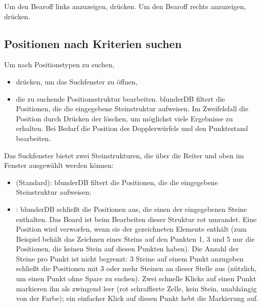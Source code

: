 \documentclass[letterpaper,10pt,german]{sphinxmanual}
\begin{document}
\sphinxAtStartPar
Um den Bearoff links anzuzeigen,  drücken. Um den Bearoff rechts anzuzeigen,  drücken.


\subsection{Positionen nach Kriterien suchen}
\label{\detokenize{guide_utilisateur:rechercher-des-positions-selon-des-criteres}}
\sphinxAtStartPar
Um nach Positionstypen zu suchen,
\begin{itemize}
\item {} 
\sphinxAtStartPar
{} drücken, um das Suchfenster zu öffnen,

\item {} 
\sphinxAtStartPar
die zu suchende Positionsstruktur bearbeiten. blunderDB filtert die Positionen, die  die eingegebene Steinstruktur aufweisen. Im Zweifelsfall die Position durch Drücken der  löschen, um möglichst viele Ergebnisse zu erhalten. Bei Bedarf die Position des Dopplerwürfels und den Punktestand bearbeiten.

\end{itemize}

\sphinxAtStartPar
Das Suchfenster bietet zwei Steinstrukturen, die über die Reiter  und  oben im Fenster ausgewählt werden können:
\begin{itemize}
\item {} 
\sphinxAtStartPar
{} (Standard): blunderDB filtert die Positionen, die  die eingegebene Steinstruktur aufweisen;

\item {} 
\sphinxAtStartPar
{}: blunderDB schließt die Positionen aus, die einen der eingegebenen Steine enthalten. Das Board ist beim Bearbeiten dieser Struktur rot umrandet. Eine Position wird verworfen, wenn sie  der gezeichneten Elemente enthält (zum Beispiel behält das Zeichnen eines Steins auf den Punkten 1, 3 und 5 nur die Positionen, die keinen Stein auf diesen Punkten haben). Die Anzahl der Steine pro Punkt ist nicht begrenzt: 3 Steine auf einem Punkt anzugeben schließt die Positionen mit 3 oder mehr Steinen an dieser Stelle aus (nützlich, um einen Punkt ohne Spare zu suchen). Zwei schnelle Klicks auf einen Punkt markieren ihn als zwingend leer (rot schraffierte Zelle, kein Stein, unabhängig von der Farbe); ein einfacher Klick auf diesen Punkt hebt die Markierung auf.

\end{itemize}
\end{document}
